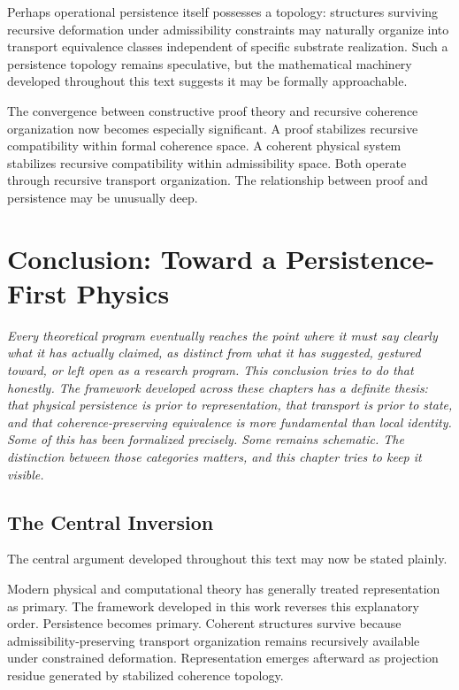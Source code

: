 \documentclass[11pt,openany]{book}
\theoremstyle{definition}
\theoremstyle{plain}
\begin{document}
Perhaps operational persistence itself possesses a topology: structures surviving recursive deformation under admissibility constraints may naturally organize into transport equivalence classes independent of specific substrate realization. Such a persistence topology remains speculative, but the mathematical machinery developed throughout this text suggests it may be formally approachable.

The convergence between constructive proof theory and recursive coherence organization now becomes especially significant. A proof stabilizes recursive compatibility within formal coherence space. A coherent physical system stabilizes recursive compatibility within admissibility space. Both operate through recursive transport organization. The relationship between proof and persistence may be unusually deep.


\chapter{Conclusion: Toward a Persistence-First Physics}

\noindent\textit{Every theoretical program eventually reaches the point where it must say clearly what it has actually claimed, as distinct from what it has suggested, gestured toward, or left open as a research program. This conclusion tries to do that honestly. The framework developed across these chapters has a definite thesis: that physical persistence is prior to representation, that transport is prior to state, and that coherence-preserving equivalence is more fundamental than local identity. Some of this has been formalized precisely. Some remains schematic. The distinction between those categories matters, and this chapter tries to keep it visible.}

\bigskip

\section{The Central Inversion}

The central argument developed throughout this text may now be stated plainly.

Modern physical and computational theory has generally treated representation as primary. The framework developed in this work reverses this explanatory order. Persistence becomes primary. Coherent structures survive because admissibility-preserving transport organization remains recursively available under constrained deformation. Representation emerges afterward as projection residue generated by stabilized coherence topology.
\end{document}
